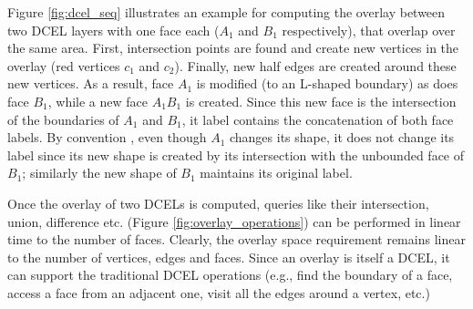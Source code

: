 Figure \ref{fig:dcel_seq} illustrates an example for computing the overlay between two DCEL layers with one face each ($A_1$ and $B_1$ respectively), that overlap over the same area. First, intersection points are found and create new vertices in the overlay (red vertices $c_1$ and $c_2$). Finally, new half edges are created around these new vertices. 
As a result, face $A_1$ is modified (to an L-shaped boundary) as does face $B_1$, while a new face $A_1B_1$ is created. 
Since this new face is the intersection of the boundaries of $A_1$ and $B_1$, it label contains the concatenation of both face labels. 
By convention \cite{berg_computational_2008}, even though $A_1$ changes its shape, it does not change its label since its new shape is created by its intersection with the unbounded face of $B_1$; similarly the new shape of $B_1$ maintains its original label. 




Once the overlay of two DCELs is computed, queries like their intersection, union, difference etc. (Figure \ref{fig:overlay_operations}) can be performed in linear time to the number of faces. 
Clearly, the overlay space requirement remains linear to the number of vertices, edges and faces.  
Since an overlay is itself a DCEL, it can support the traditional DCEL operations (e.g., find the boundary of a face, access a face from an adjacent one, visit all the edges around a vertex, etc.)

